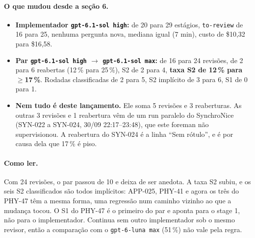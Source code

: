 \documentclass[11pt,a4paper]{article}
\begin{document}
\paragraph{O que mudou desde a seção 6.}
\begin{itemize}
  \item \textbf{Implementador \texttt{gpt-6.1-sol high}:} de 20 para 29
        estágios, \texttt{to-review} de 16 para 25, nenhuma pergunta nova,
        mediana igual (7 min), custo de \$10,32 para \$16,58.
  \item \textbf{Par \texttt{gpt-6.1-sol high} $\to$ \texttt{gpt-6.1-sol
        max}:} de 16 para 24 revisões, de 2 para 6 reabertas (12\,\% para
        25\,\%), S2 de 2 para 4, \textbf{taxa S2 de 12\,\% para $\geq$17\,\%}.
        Rodadas classificadas de 2 para 5, S2 implícito de 3 para 6, S1 de 0
        para 1.
  \item \textbf{Nem tudo é deste lançamento.} Ele soma 5 revisões e 3
        reaberturas. As outras 3 revisões e 1 reabertura vêm de um run
        paralelo do SynchroNice (SYN-022 a SYN-024, 30/09 22:17--23:48), que
        este foreman não supervisionou. A reabertura do SYN-024 é a linha
        ``Sem rótulo'', e é por causa dela que 17\,\% é piso.
\end{itemize}

\paragraph{Como ler.} Com 24 revisões, o par passou de 10 e deixa de ser
anedota. A taxa S2 subiu, e os seis S2 classificados são todos implícitos:
APP-025, PHY-41 e agora os três do PHY-47 têm a mesma forma, uma regressão
num caminho vizinho ao que a mudança tocou. O S1 do PHY-47 é o primeiro do
par e aponta para o stage 1, não para o implementador. Continua sem outro
implementador sob o mesmo revisor, então a comparação com o
\texttt{gpt-6-luna max} (51\,\%) não vale pela regra.
\end{document}
